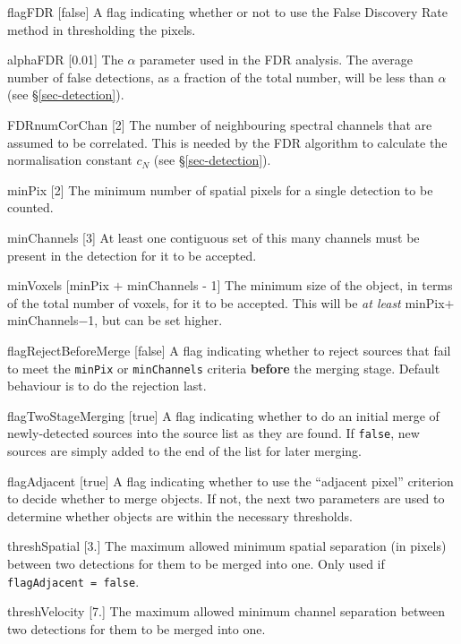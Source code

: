 \begin{Lentry}
\item[{flagFDR [false]}] A flag indicating whether or not to use
  the False Discovery Rate method in thresholding the pixels.
\item[{alphaFDR [0.01]}] The $\alpha$ parameter used in the FDR
  analysis. The average number of false detections, as a fraction of
  the total number, will be less than $\alpha$ (see
  \S\ref{sec-detection}).
\item[{FDRnumCorChan [2]}] The number of neighbouring spectral
  channels that are assumed to be correlated. This is needed by the
  FDR algorithm to calculate the normalisation constant $c_N$ (see
  \S\ref{sec-detection}). 
\end{Lentry}

\begin{Lentry}
\item[{minPix [2]}] The minimum number of spatial pixels for a
  single detection to be counted.
\item[{minChannels [3]}] At least one contiguous set of this many
  channels must be present in the detection for it to be accepted.
\item[{minVoxels [minPix $+$ minChannels - 1]}] The minimum size of
  the object, in terms of the total number of voxels, for it to be
  accepted. This will be \textit{at least} minPix$+$minChannels$-$1,
  but can be set higher.
\item[{flagRejectBeforeMerge [false]}] A flag indicating whether to
  reject sources that fail to meet the \texttt{minPix} or
  \texttt{minChannels} criteria \textbf{before} the merging
  stage. Default behaviour is to do the rejection last.
\item[{flagTwoStageMerging [true]}] A flag indicating whether to do an
  initial merge of newly-detected sources into the source list as they
  are found. If \texttt{false}, new sources are simply added to the
  end of the list for later merging.
\item[{flagAdjacent [true]}] A flag indicating whether to use
  the ``adjacent pixel'' criterion to decide whether to merge
  objects. If not, the next two parameters are used to determine
  whether objects are within the necessary thresholds.
\item[{threshSpatial [3.]}] The maximum allowed minimum spatial
  separation (in pixels) between two detections for them to be merged
  into one. Only used if \texttt{flagAdjacent = false}.
\item[{threshVelocity [7.]}] The maximum allowed minimum channel
  separation between two detections for them to be merged into
  one. 
\end{Lentry}

